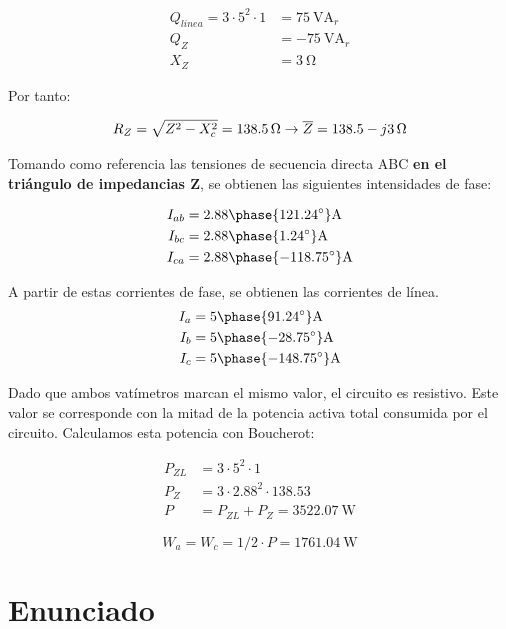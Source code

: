 \begin{align*}
  Q_{linea} = 3 \cdot 5^2 \cdot 1 &= \SI{75}{\volt\ampere}_r\\
  Q_Z &= -\SI{75}{\volt\ampere}_r\\
  X_Z &= \SI{3}{\ohm}
\end{align*}

Por tanto:

\[
  R_Z = \sqrt{Z^2 - X_c^2} = \SI{138.5}{\ohm} \rightarrow \overline{Z} = \SI[parse-numbers=false]{138.5 - j3}{\ohm}
\]

Tomando como referencia las tensiones de secuencia directa ABC
\textbf{en el triángulo de impedancias Z}, se obtienen las siguientes
intensidades de fase:

\begin{align*}
  I_{ab} &= {2.88\phase{121.24^\circ}}\unit{\ampere}\\
  I_{bc} &= {2.88\phase{1.24^\circ}}\unit{\ampere}\\
  I_{ca} &= {2.88\phase{-118.75^\circ}}\unit{\ampere}\\
\end{align*}

A partir de estas corrientes de fase, se obtienen las corrientes de línea.
\begin{align*}
  I_{a} &= {5\phase{91.24^\circ}}\unit{\ampere}\\
  I_{b} &= {5\phase{-28.75^\circ}}\unit{\ampere}\\
  I_{c} &= {5\phase{-148.75^\circ}}\unit{\ampere}
\end{align*}



Dado que ambos vatímetros marcan el mismo valor, el circuito es
resistivo. Este valor se corresponde con la mitad de la potencia
activa total consumida por el circuito. Calculamos esta potencia con Boucherot:


\begin{align*}
  P_{ZL} &= 3 \cdot 5^2 \cdot 1\\
  P_Z &= 3 \cdot 2.88^2 \cdot 138.53\\
  P &= P_{ZL} + P_{Z} = \SI{3522.07}{\watt}
\end{align*}

\[
  W_a = W_c = 1/2 \cdot P = \SI{1761.04}{\watt}
\]



\section{Enunciado}


